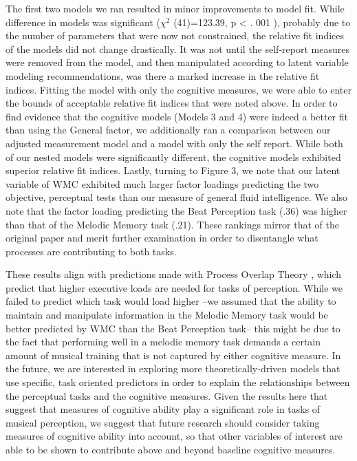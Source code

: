 \documentclass[]{book}
\begin{document}
The first two models we ran resulted in minor improvements to model fit.
While difference in models was significant (\(\chi^2\) (41)=123.39, p \textless{} . 001 ), probably due to the number of parameters that were now not constrained, the relative fit indices of the models did not change drastically.
It was not until the self-report measures were removed from the model, and then manipulated according to latent variable modeling recommendations, was there a marked increase in the relative fit indices.
Fitting the model with only the cognitive measures, we were able to enter the bounds of acceptable relative fit indices that were noted above.
In order to find evidence that the cognitive models (Models 3 and 4) were indeed a better fit than using the General factor, we additionally ran a comparison between our adjusted measurement model and a model with only the self report.
While both of our nested models were significantly different, the cognitive models exhibited superior relative fit indices.
Lastly, turning to Figure 3, we note that our latent variable of WMC exhibited much larger factor loadings predicting the two objective, perceptual tests than our measure of general fluid intelligence.
We also note that the factor loading predicting the Beat Perception task (.36) was higher than that of the Melodic Memory task (.21).
These rankings mirror that of the original \citep{mullensiefenMusicalityNonMusiciansIndex2014} paper and merit further examination in order to disentangle what processes are contributing to both tasks.

These results align with predictions made with Process Overlap Theory \citep{kovacsProcessOverlapTheory2016}, which predict that higher executive loads are needed for tasks of perception.
While we failed to predict which task would load higher --we assumed that the ability to maintain and manipulate information in the Melodic Memory task would be better predicted by WMC than the Beat Perception task-- this might be due to the fact that performing well in a melodic memory task demands a certain amount of musical training that is not captured by either cognitive measure.
In the future, we are interested in exploring more theoretically-driven models that use specific, task oriented predictors in order to explain the relationships between the perceptual tasks and the cognitive measures.
Given the results here that suggest that measures of cognitive ability play a significant role in tasks of musical perception, we suggest that future research should consider taking measures of cognitive ability into account, so that other variables of interest are able to be shown to contribute above and beyond baseline cognitive measures.
\end{document}
